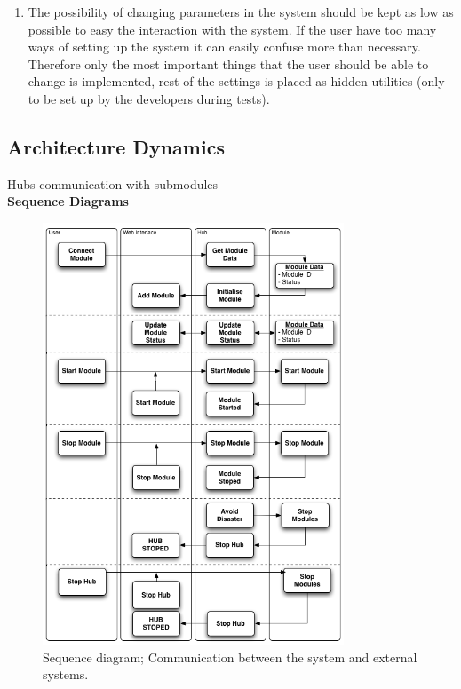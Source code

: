\begin{enumerate}
	\item The possibility of changing parameters in the system should be kept as low as possible to easy the interaction with the system. If the user have too many ways of setting up the system it can easily confuse more than necessary. Therefore only the most important things that the user should be able to change is implemented, rest of the settings is placed as hidden utilities (only to be set up by the developers during tests). 
\end{enumerate}

\subsection{Architecture Dynamics}
Hubs communication with submodules
\\ 
\textbf{Sequence Diagrams}
\begin{figure}[H]
	\begin{centering}
		 \includegraphics[width=0.8\textwidth]{images/SequenceDiagram.png}
		\caption{Sequence diagram; Communication between the system and external systems.}
 	\end{centering}
\end{figure}

